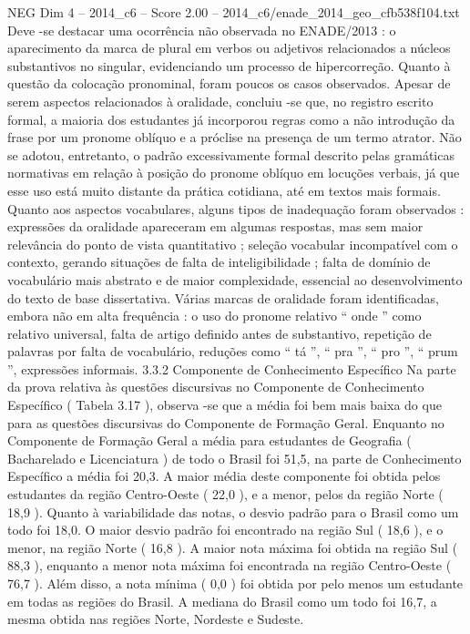 \begin{textsample}{NEG Dim 4 – 2014\_c6 – Score 2.00 – 2014\_c6/enade\_2014\_geo\_cfb538f104.txt}
Deve -se destacar uma ocorrência não observada no ENADE/2013 : o aparecimento da marca de plural em verbos ou adjetivos relacionados a núcleos substantivos no singular, evidenciando um processo de hipercorreção.
Quanto à questão da colocação pronominal, foram poucos os casos observados.
Apesar de serem aspectos relacionados à oralidade, concluiu -se que, no registro escrito formal, a maioria dos estudantes já incorporou regras como a não introdução da frase por um pronome oblíquo e a próclise na presença de um termo atrator.
Não se adotou, entretanto, o padrão excessivamente formal descrito pelas gramáticas normativas em relação à posição do pronome oblíquo em locuções verbais, já que esse uso está muito distante da prática cotidiana, até em textos mais formais.
Quanto aos aspectos vocabulares, alguns tipos de inadequação foram observados : expressões da oralidade apareceram em algumas respostas, mas sem maior relevância do ponto de vista quantitativo ; seleção vocabular incompatível com o contexto, gerando situações de falta de inteligibilidade ; falta de domínio de vocabulário mais abstrato e de maior complexidade, essencial ao desenvolvimento do texto de base dissertativa.
Várias marcas de oralidade foram identificadas, embora não em alta frequência : o uso do pronome relativo “ onde ” como relativo universal, falta de artigo definido antes de substantivo, repetição de palavras por falta de vocabulário, reduções como “ tá ”, “ pra ”, “ pro ”, “ prum ”, expressões informais. 3.3.2 Componente de Conhecimento Específico Na parte da prova relativa às questões discursivas no Componente de Conhecimento Específico ( Tabela 3.17 ), observa -se que a média foi bem mais baixa do que para as questões discursivas do Componente de Formação Geral.
Enquanto no Componente de Formação Geral a média para estudantes de Geografia ( Bacharelado e Licenciatura ) de todo o Brasil foi 51,5, na parte de Conhecimento Específico a média foi 20,3.
A maior média deste componente foi obtida pelos estudantes da região Centro-Oeste ( 22,0 ), e a menor, pelos da região Norte ( 18,9 ).
Quanto à variabilidade das notas, o desvio padrão para o Brasil como um todo foi 18,0.
O maior desvio padrão foi encontrado na região Sul ( 18,6 ), e o menor, na região Norte ( 16,8 ).
A maior nota máxima foi obtida na região Sul ( 88,3 ), enquanto a menor nota máxima foi encontrada na região Centro-Oeste ( 76,7 ).
Além disso, a nota mínima ( 0,0 ) foi obtida por pelo menos um estudante em todas as regiões do Brasil.
A mediana do Brasil como um todo foi 16,7, a mesma obtida nas regiões Norte, Nordeste e Sudeste.

\end{textsample}
